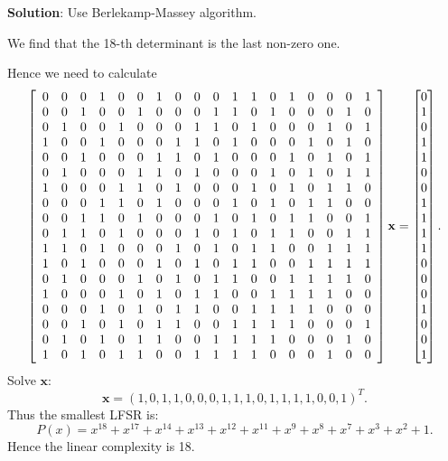 \documentclass[12pt]{article}
\theoremstyle{plain}
\begin{document}
{\bf Solution}: Use Berlekamp-Massey algorithm.

We find that the 18-th determinant is the last non-zero one. 

Hence we need to calculate
$$
\left[
\begin{array}{*{18}c}
0&0&0&1&0&0&1&0&0&0&1&1&0&1&0&0&0&1 \\
0&0&1&0&0&1&0&0&0&1&1&0&1&0&0&0&1&0 \\
0&1&0&0&1&0&0&0&1&1&0&1&0&0&0&1&0&1 \\
1&0&0&1&0&0&0&1&1&0&1&0&0&0&1&0&1&0 \\
0&0&1&0&0&0&1&1&0&1&0&0&0&1&0&1&0&1 \\
0&1&0&0&0&1&1&0&1&0&0&0&1&0&1&0&1&1 \\
1&0&0&0&1&1&0&1&0&0&0&1&0&1&0&1&1&0 \\
0&0&0&1&1&0&1&0&0&0&1&0&1&0&1&1&0&0 \\
0&0&1&1&0&1&0&0&0&1&0&1&0&1&1&0&0&1 \\
0&1&1&0&1&0&0&0&1&0&1&0&1&1&0&0&1&1 \\
1&1&0&1&0&0&0&1&0&1&0&1&1&0&0&1&1&1 \\
1&0&1&0&0&0&1&0&1&0&1&1&0&0&1&1&1&1 \\
0&1&0&0&0&1&0&1&0&1&1&0&0&1&1&1&1&0 \\
1&0&0&0&1&0&1&0&1&1&0&0&1&1&1&1&0&0 \\
0&0&0&1&0&1&0&1&1&0&0&1&1&1&1&0&0&0 \\
0&0&1&0&1&0&1&1&0&0&1&1&1&1&0&0&0&1 \\
0&1&0&1&0&1&1&0&0&1&1&1&1&0&0&0&1&0 \\
1&0&1&0&1&1&0&0&1&1&1&1&0&0&0&1&0&0 \\
\end{array}
\right]
\mathbf{x} = \m{
0\\1\\0\\1\\1\\0\\0\\1\\1\\1\\1\\0\\0\\0\\1\\0\\0\\1\\
}.
$$
Solve $\mathbf{x}$:
$$\mathbf{x} = (
  		1,
       0,
       1,
       1,
       0,
       0,
       0,
       1,
       1,
       1,
       0,
       1,
       1,
       1,
       1,
       0,
       0,
       1
)^T.$$
Thus the smallest LFSR is:
$$P(x) = x^{18} + x^{17} + x^{14} + x^{13} + x^{12} + x^{11} + x^9 + x^8 + x^7 + x^3 + x^2 + 1.$$
Hence the linear complexity is 18.
\end{document}
